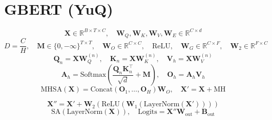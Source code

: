 \documentclass{article}
\begin{document}
\section*{GBERT (YuQ)}
\[
\bm{X} \in \mathbb{R}^{B \times T \times C}, \quad 
\bm{W}_Q, \bm{W}_K, \bm{W}_V, \bm{W}_E \in \mathbb{R}^{C \times d}
\]
\[
D = \frac{C}{H}, \quad 
\bm{M} \in \{0, -\infty\}^{T \times T}, \quad 
\bm{W}_O \in \mathbb{R}^{C \times C}, \quad 
\text{ReLU}, \quad 
\bm{W}_G \in \mathbb{R}^{C \times F}, \quad 
\bm{W}_2 \in \mathbb{R}^{F \times C}
\]
\[
\bm{Q}_n = \bm{X} \bm{W}_Q^{(n)}, \quad 
\bm{K}_n = \bm{X} \bm{W}_K^{(n)}, \quad 
\bm{V}_h = \bm{X} \bm{W}_V^{(n)}
\]
\[
\bm{A}_h = \text{Softmax}\left(\frac{\bm{Q}_n \bm{K}_n^\top}{\sqrt{d}} + \bm{M} \right), \quad 
\bm{O}_h = \bm{A}_h \bm{V}_h
\]
\[
\text{MHSA}(\bm{X}) = \text{Concat}(\bm{O}_1, \dots, \bm{O}_H) \bm{W}_O, \quad 
\bm{X}' = \bm{X} + \text{MH}
\]

\[
\bm{X}'' = \bm{X}' + \bm{W}_2 \left( \text{ReLU}\left( \bm{W}_1 (\text{LayerNorm}(\bm{X}')) \right) \right)
\]
\[
\text{SA}(\text{LayerNorm}(\bm{X})), \quad 
\text{Logits} = \bm{X}'' \bm{W}_{\text{out}} + \bm{B}_{\text{out}}
\]
\end{document}
